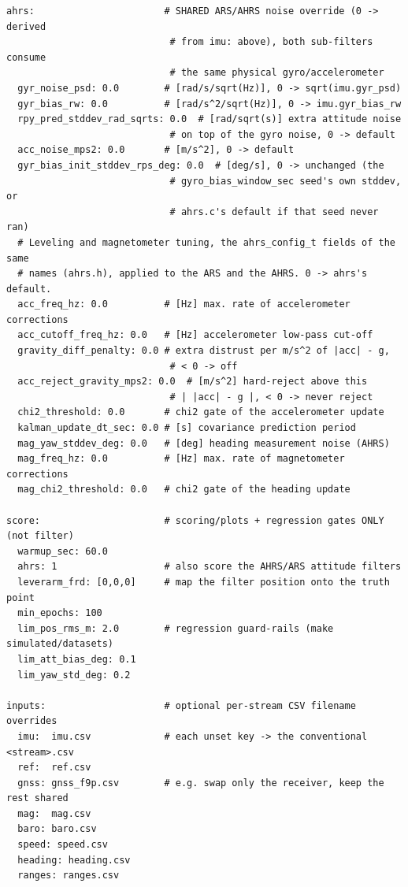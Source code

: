 \documentclass[11pt,a4paper]{article}
\begin{document}
\begin{lstlisting}[style=cfg]
ahrs:                       # SHARED ARS/AHRS noise override (0 -> derived
                             # from imu: above), both sub-filters consume
                             # the same physical gyro/accelerometer
  gyr_noise_psd: 0.0        # [rad/s/sqrt(Hz)], 0 -> sqrt(imu.gyr_psd)
  gyr_bias_rw: 0.0          # [rad/s^2/sqrt(Hz)], 0 -> imu.gyr_bias_rw
  rpy_pred_stddev_rad_sqrts: 0.0  # [rad/sqrt(s)] extra attitude noise
                             # on top of the gyro noise, 0 -> default
  acc_noise_mps2: 0.0       # [m/s^2], 0 -> default
  gyr_bias_init_stddev_rps_deg: 0.0  # [deg/s], 0 -> unchanged (the
                             # gyro_bias_window_sec seed's own stddev, or
                             # ahrs.c's default if that seed never ran)
  # Leveling and magnetometer tuning, the ahrs_config_t fields of the same
  # names (ahrs.h), applied to the ARS and the AHRS. 0 -> ahrs's default.
  acc_freq_hz: 0.0          # [Hz] max. rate of accelerometer corrections
  acc_cutoff_freq_hz: 0.0   # [Hz] accelerometer low-pass cut-off
  gravity_diff_penalty: 0.0 # extra distrust per m/s^2 of |acc| - g,
                             # < 0 -> off
  acc_reject_gravity_mps2: 0.0  # [m/s^2] hard-reject above this
                             # | |acc| - g |, < 0 -> never reject
  chi2_threshold: 0.0       # chi2 gate of the accelerometer update
  kalman_update_dt_sec: 0.0 # [s] covariance prediction period
  mag_yaw_stddev_deg: 0.0   # [deg] heading measurement noise (AHRS)
  mag_freq_hz: 0.0          # [Hz] max. rate of magnetometer corrections
  mag_chi2_threshold: 0.0   # chi2 gate of the heading update

score:                      # scoring/plots + regression gates ONLY (not filter)
  warmup_sec: 60.0
  ahrs: 1                   # also score the AHRS/ARS attitude filters
  leverarm_frd: [0,0,0]     # map the filter position onto the truth point
  min_epochs: 100
  lim_pos_rms_m: 2.0        # regression guard-rails (make simulated/datasets)
  lim_att_bias_deg: 0.1
  lim_yaw_std_deg: 0.2

inputs:                     # optional per-stream CSV filename overrides
  imu:  imu.csv             # each unset key -> the conventional <stream>.csv
  ref:  ref.csv
  gnss: gnss_f9p.csv        # e.g. swap only the receiver, keep the rest shared
  mag:  mag.csv
  baro: baro.csv
  speed: speed.csv
  heading: heading.csv
  ranges: ranges.csv
\end{lstlisting}
\end{document}

